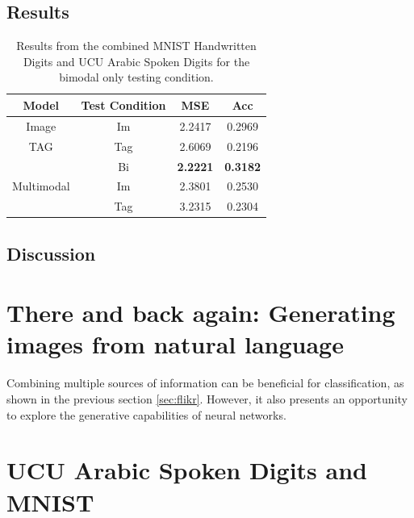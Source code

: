 \subsection{Results}
\begin{table}
	\centering
		\begin{tabular}{|c|c|c|c|}
		\hline
		Model	& Test Condition & MSE & Acc \\ \hline
		Image	& Im & 	2.2417	&	0.2969 \\ \hline		
		TAG		& Tag & 	2.6069	&	0.2196 \\ \hline		
\multirow{3}{*}{Multimodal} & Bi & \textbf{2.2221}	&	\textbf{0.3182} \\ \cline{2-4}
				& Im & 2.3801	&	0.2530\\ \cline{2-4}	
		
				& Tag & 	3.2315	&	0.2304 \\ \hline		
						
		\end{tabular}
		\caption{Results from the combined MNIST Handwritten Digits and UCU Arabic Spoken Digits for the bimodal only testing condition.}
		\label{tab:flikr_res}

\end{table}


%

\subsection{Discussion}


\section{There and back again: Generating images from natural language}
Combining multiple sources of information can be beneficial for classification, as shown in the previous section \ref{sec:flikr}. However, it also presents an opportunity to explore the generative capabilities of neural networks. 


\section{UCU Arabic Spoken Digits and MNIST} 
\label{sec:UCU}
